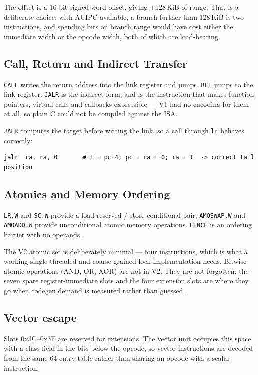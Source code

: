 \documentclass[11pt,a4paper]{article}
\begin{document}
The offset is a 16-bit signed word offset, giving $\pm$128\,KiB of range. That
is a deliberate choice: with AUIPC available, a branch further than 128\,KiB is
two instructions, and spending bits on branch range would have cost either the
immediate width or the opcode width, both of which are load-bearing.

\subsection{Call, Return and Indirect Transfer}

{\tt CALL} writes the return address into the link register and jumps. {\tt RET}
jumps to the link register. {\tt JALR} is the indirect form, and is the
instruction that makes function pointers, virtual calls and callbacks
expressible --- V1 had no encoding for them at all, so plain C could not be
compiled against the ISA.

{\tt JALR} computes the target before writing the link, so a call through
{\tt lr} behaves correctly:

\begin{lstlisting}[style=Cstyle]
  jalr  ra, ra, 0       # t = pc+4; pc = ra + 0; ra = t  -> correct tail position
\end{lstlisting}

\subsection{Atomics and Memory Ordering}

{\tt LR.W} and {\tt SC.W} provide a load-reserved / store-conditional pair;
{\tt AMOSWAP.W} and {\tt AMOADD.W} provide unconditional atomic memory
operations. {\tt FENCE} is an ordering barrier with no operands.

The V2 atomic set is deliberately minimal --- four instructions, which is what a
working single-threaded and coarse-grained lock implementation needs. Bitwise
atomic operations (AND, OR, XOR) are not in V2. They are not forgotten: the
seven spare register-immediate slots and the four extension slots are where they
go when codegen demand is measured rather than guessed.

\subsection{Vector escape}
\label{sec:vector-escape}

Slots 0x3C--0x3F are reserved for extensions. The vector unit occupies this
space with a class field in the bits below the opcode, so vector instructions
are decoded from the same 64-entry table rather than sharing an opcode with a
scalar instruction.
\end{document}
